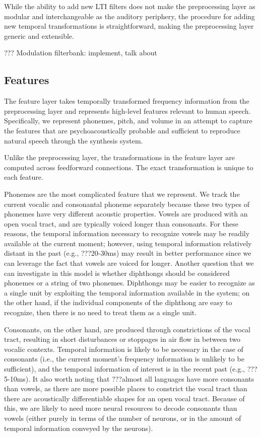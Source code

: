 While the ability to add new LTI filters
does not make the preprocessing layer
as modular and interchangeable
as the auditory periphery,
the procedure for adding
new temporal transformations
is straightforward,
making the preprocessing layer
generic and extensible.


??? Modulation filterbank: implement, talk about

\subsection{Features}

The feature layer takes temporally transformed
frequency information from the preprocessing layer
and represents high-level features relevant
to human speech.
Specifically, we represent phonemes,
pitch, and volume in an attempt
to capture the features that are
psychoacoustically probable
and sufficient to reproduce
natural speech through the synthesis system.

Unlike the preprocessing layer,
the transformations in the feature layer
are computed across feedforward connections.
The exact transformation is unique to each feature.

Phonemes are the most complicated feature
that we represent.
We track
the current vocalic and consonantal phoneme separately
because these two types of phonemes
have very different acoustic properties.
Vowels are produced with an open vocal tract,
and are typically voiced longer than consonants.
For these reasons, the temporal information
necessary to recognize vowels
may be readily available at
the current moment;
however, using temporal information relatively
distant in the past (e.g., ???20-30ms)
may result in better performance since we can
leverage the fact that vowels are voiced for longer.
Another question that we can investigate in this model
is whether diphthongs should be considered phonemes
or a string of two phonemes.
Diphthongs may be easier to recognize as a single unit
by exploiting the temporal information available
in the system;
on the other hand, if the individual components
of the diphthong are easy to recognize,
then there is no need to treat them as a single unit.

Consonants, on the other hand, are produced
through constrictions of the vocal tract,
resulting in short disturbances or stoppages in air flow
in between two vocalic contexts.
Temporal information is likely to be necessary
in the case of consonants
(i.e., the current moment's frequency information
is unlikely to be sufficient),
and the temporal information of interest
is in the recent past (e.g., ???5-10ms).
It also worth noting that ???almost
all languages have more consonants than vowels,
as there are more possible places to constrict
the vocal tract than there are acoustically
differentiable shapes for an open vocal tract.
Because of this, we are likely to need
more neural resources to decode consonants
than vowels
(either purely in terms of the number of neurons,
or in the amount of temporal information conveyed
by the neurons).

